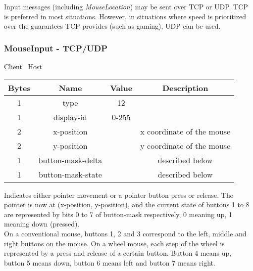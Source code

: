 Input messages (including \emph{MouseLocation}) may be sent over TCP or UDP. TCP is preferred in most situations.
However, in situations where speed is prioritized over the guarantees TCP provides (such as gaming), UDP can be
used.

\subsubsection{MouseInput - TCP/UDP}

\begin{center}
    Client \textrightarrow\ Host\\
    \begin{tabular}{|c|c|c|c|}
        \hline
        \textbf{Bytes} & \textbf{Name}     & \textbf{Value} & \textbf{Description}      \\
        \hline
        1              & type              & 12              &                           \\
        \hline
        1              & display-id        & 0-255          &                           \\
        \hline
        2              & x-position        &                & x coordinate of the mouse \\
        \hline
        2              & y-position        &                & y coordinate of the mouse \\
        \hline
        1              & button-mask-delta &                & described below           \\
        \hline
        1              & button-mask-state &                & described below           \\
        \hline
    \end{tabular}
\end{center}

Indicates either pointer movement or a pointer button press or release. The pointer is now at (x-position,
y-position), and the current state of buttons 1 to 8 are represented by bits 0 to 7 of button-mask respectively,
0 meaning up, 1 meaning down (pressed).\\

On a conventional mouse, buttons 1, 2 and 3 correspond to the left, middle and right buttons on the mouse. On a
wheel mouse, each step of the wheel is represented by a press and release of a certain button. Button 4 means up,
button 5 means down, button 6 means left and button 7 means right.\\

